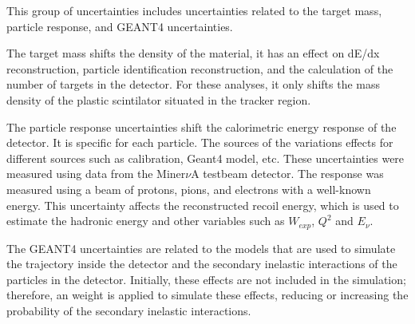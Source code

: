 This group of uncertainties includes uncertainties related to the target mass, particle response, and GEANT4 uncertainties. 

The target mass shifts the density of the material, it has an effect on dE/dx reconstruction, particle identification reconstruction, and the calculation of the number of targets in the detector. For these analyses, it only shifts the mass density of the plastic scintilator situated in the tracker region.  

The particle response uncertainties shift the calorimetric energy response of the detector. It is specific for each particle. The sources of the variations effects for different sources such as calibration, Geant4 model, etc. These uncertainties were measured using data from the Miner$\nu$A testbeam detector\cite{TestBeamPion}\cite{TestBeamProton}. The response was measured using a beam of protons, pions, and electrons with a well-known energy. This uncertainty affects the reconstructed recoil energy, which is used to estimate the hadronic energy and other variables such as $W_{exp}$, $Q^2$ and $E_\nu$.

The GEANT4 uncertainties are related to the models that are used to simulate the trajectory inside the detector and the secondary inelastic interactions of the particles in the detector. Initially, these effects are not included in the simulation; therefore, an weight is applied to simulate these effects, reducing or increasing the probability of the secondary inelastic interactions. 

